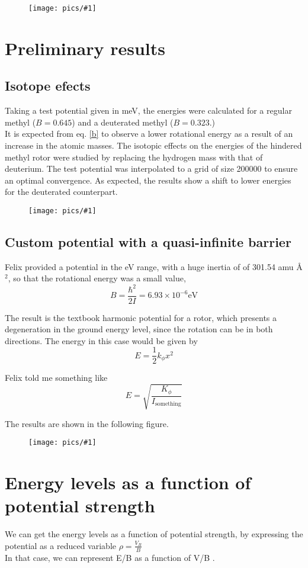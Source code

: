 \documentclass[12pt,a4paper]{article}
\newcommand{\NEWPICC}[2]{
\begin{figure}[H]
    \centering
    \texttt{[image: pics/\#1]}
    \label{#1}
    \end{figure}
    }
\begin{document}
\NEWPICC{titov2023_1.png}{1}


\section{Preliminary results}

\subsection{Isotope efects}


Taking a test potential given in meV, the energies were calculated for a regular methyl ($B=0.645$) and a deuterated methyl ($B=0.323$.)\\

It is expected from eq. \eqref{b} to observe a lower rotational energy as a result of an increase in the atomic masses. The isotopic effects on the energies of the hindered methyl rotor were studied by replacing the hydrogen mass with that of deuterium. The test potential was interpolated to a grid of size 200000 to ensure an optimal convergence. As expected, the results show a shift to lower energies for the deuterated counterpart.

\NEWPICC{interpolate_potential_HD.png}{1}


\subsection{Custom potential with a quasi-infinite barrier}

Felix provided a potential in the eV range, with a huge inertia of of 301.54 amu \AA$^2$, so that the rotational energy was a small value,
$$
B = \frac{\hbar^2}{2 I} = 6.93 \times 10^{-6} \text{eV}
$$

The result is the textbook harmonic potential for a rotor, which presents a degeneration in the ground energy level, since the rotation can be in both directions. The energy in this case would be given by
$$
E = \frac{1}{2} k_{\phi} x^2
$$

Felix told me something like 
$$
E=\sqrt{\frac{K_{\phi}}{I_{\text{something}}}}
$$

The results are shown in the following figure.


\NEWPICC{potential_felix.png}{0.95}


\section{Energy levels as a function of potential strength}


We can get the energy levels as a function of potential strength, by expressing the potential as a reduced variable $\rho=\frac{V_B}{B}$\\

In that case, we can represent E/B as a function of V/B \cite{sakai2007}.


\end{document}
